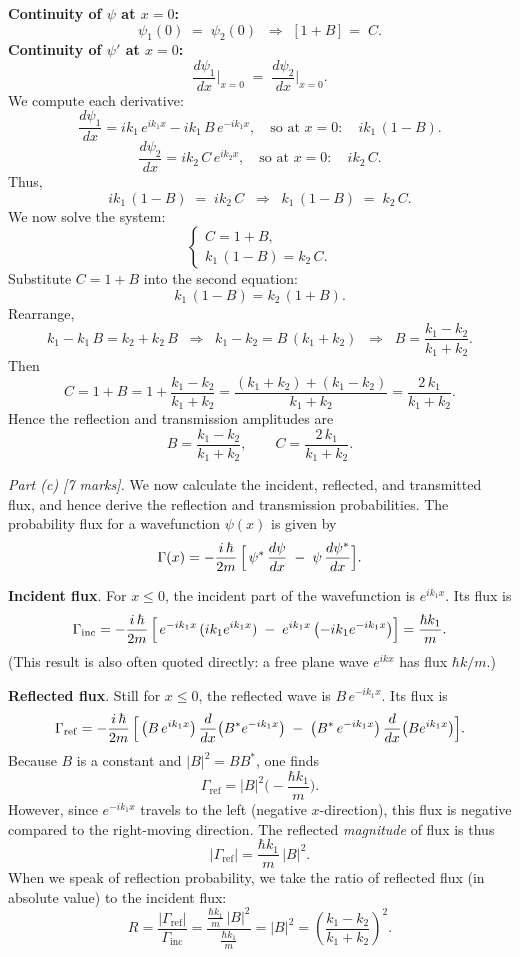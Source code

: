 \documentclass{article}
\begin{document}
\medskip\noindent
\textbf{Continuity of $\psi$ at $x=0$:}
\[
\psi_1(0) \;=\; \psi_2(0)
\;\;\Longrightarrow\;\;
\bigl[\,1 + B\,\bigr]
\;=\;
C.
\]
\textbf{Continuity of $\psi'$ at $x=0$:}
\[
\frac{d\psi_1}{dx}\bigg|_{x=0}
\;=\;
\frac{d\psi_2}{dx}\bigg|_{x=0}.
\]
We compute each derivative:
\[
\frac{d\psi_1}{dx} = i k_1 \,e^{i k_1 x} - i k_1 \,B\,e^{-i k_1 x},
\quad\text{so at } x=0:\quad
i k_1\,(1 - B).
\]
\[
\frac{d\psi_2}{dx} = i k_2\,C\,e^{i k_2 x},
\quad\text{so at } x=0:\quad
i k_2\,C.
\]
Thus,
\[
i k_1\,(1 - B) \;=\; i k_2\,C 
\;\;\Longrightarrow\;\;
k_1\,(1 - B) \;=\; k_2\,C.
\]
We now solve the system:
\[
\begin{cases}
C = 1 + B,\\
k_1\,(1 - B) = k_2\,C.
\end{cases}
\]
Substitute $C = 1 + B$ into the second equation:
\[
k_1\,(1 - B) = k_2\,(1 + B).
\]
Rearrange,
\[
k_1 - k_1\,B = k_2 + k_2\,B
\;\;\Longrightarrow\;\;
k_1 - k_2 = B\,(k_1 + k_2)
\;\;\Longrightarrow\;\;
B = \frac{k_1 - k_2}{k_1 + k_2}.
\]
Then
\[
C = 1 + B 
= 1 + \frac{k_1 - k_2}{k_1 + k_2}
= \frac{(k_1 + k_2) + (k_1 - k_2)}{k_1 + k_2}
= \frac{2\,k_1}{k_1 + k_2}.
\]
Hence the reflection and transmission amplitudes are 
\[
B 
= \frac{k_1 - k_2}{k_1 + k_2},
\qquad
C 
= \frac{2\,k_1}{k_1 + k_2}.
\]

\bigskip

\noindent
\textit{Part (c) [7 marks].}
We now calculate the incident, reflected, and transmitted flux, and hence derive the reflection and transmission probabilities. The probability flux for a wavefunction $\psi(x)$ is given by
\[
\Gamma(x) 
= -\frac{i\,\hbar}{2m}\,\Bigl[\,
\psi^*\,\frac{d\psi}{dx} \;-\; \psi\,\frac{d\psi^*}{dx}
\Bigr].
\]

\medskip\noindent
\textbf{Incident flux}. For $x \le 0$, the incident part of the wavefunction is $e^{i k_1 x}$. Its flux is
\[
\Gamma_{\mathrm{inc}} 
= -\frac{i\,\hbar}{2m}\,\Bigl[\,
e^{-i k_1 x}\,(i k_1 e^{i k_1 x}) 
\;-\; e^{i k_1 x}\,\bigl(-i k_1 e^{-i k_1 x}\bigr)
\Bigr]
= \frac{\hbar k_1}{m}.
\]
(This result is also often quoted directly: a free plane wave $e^{i k x}$ has flux $\hbar k / m$.)

\medskip\noindent
\textbf{Reflected flux}. Still for $x \le 0$, the reflected wave is $B\,e^{-i k_1 x}$. Its flux is
\[
\Gamma_{\mathrm{ref}} 
= -\frac{i\,\hbar}{2m}\,\Bigl[\,
\bigl(B\,e^{i k_1 x}\bigr)\,\frac{d}{dx}\bigl(B^* e^{-i k_1 x}\bigr)
\;-\;\bigl(B^*\,e^{-i k_1 x}\bigr)\,\frac{d}{dx}\bigl(B e^{i k_1 x}\bigr)
\Bigr].
\]
Because $B$ is a constant and $|B|^2 = B B^*$, one finds
\[
\Gamma_{\mathrm{ref}} 
= \left|B\right|^2 \biggl(-\frac{\hbar k_1}{m}\biggr).
\]
However, since $e^{-i k_1 x}$ travels to the left (negative $x$-direction), this flux is negative compared to the right-moving direction. The reflected \emph{magnitude} of flux is thus 
\[
\bigl|\Gamma_{\mathrm{ref}}\bigr| 
= \frac{\hbar k_1}{m}\,\bigl|B\bigr|^2.
\]
When we speak of reflection probability, we take the ratio of reflected flux (in absolute value) to the incident flux:
\[
R 
= \frac{\bigl|\Gamma_{\mathrm{ref}}\bigr|}{\Gamma_{\mathrm{inc}}} 
= \frac{\frac{\hbar k_1}{m}\,\bigl|B\bigr|^2}{\frac{\hbar k_1}{m}}
= \bigl|B\bigr|^2 
= \left(\frac{k_1 - k_2}{k_1 + k_2}\right)^2.
\]
\end{document}
